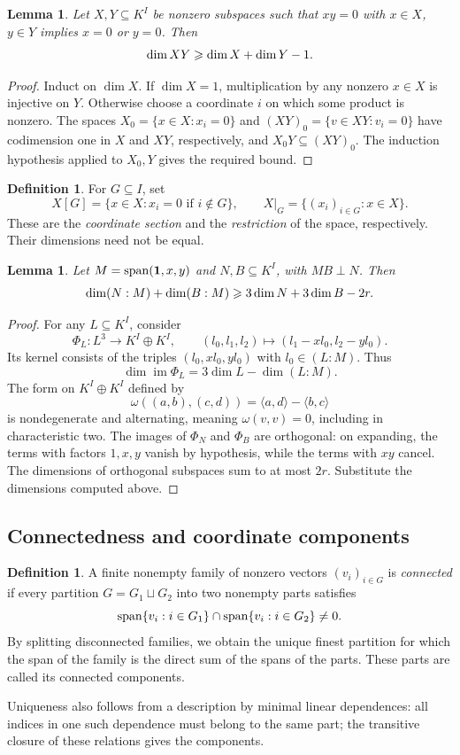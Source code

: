 \documentclass[11pt,a4paper]{article}
\numberwithin{equation}{section}
\theoremstyle{plain}
\newtheorem{lemma}[theorem]{Lemma}
\theoremstyle{definition}
\newtheorem{definition}[theorem]{Definition}
\DeclareMathOperator{\im}{im}\DeclareMathOperator{\supp}{supp}
\newcommand{\pair}[2]{\langle #1,#2\rangle}
\begin{document}
\begin{lemma}\label{lem:nz-growth}
Let $X,Y\subseteq K^I$ be nonzero subspaces such that $xy=0$ with
$x\in X$, $y\in Y$ implies $x=0$ or $y=0$. Then
\[
 \dim XY\geqslant\dim X+\dim Y-1.
\]
\end{lemma}
\begin{proof}
Induct on $\dim X$. If $\dim X=1$, multiplication by any nonzero
$x\in X$ is injective on $Y$. Otherwise choose a coordinate $i$
on which some product is nonzero. The spaces
$X_0=\{x\in X:x_i=0\}$ and $(XY)_0=\{v\in XY:v_i=0\}$
have codimension one in $X$ and $XY$, respectively, and
$X_0Y\subseteq(XY)_0$. The induction hypothesis applied to $X_0,Y$
gives the required bound.
\end{proof}

\begin{definition}
For $G\subseteq I$, set
\[
 X[G]=\{x\in X:x_i=0\text{ if }i\notin G\},\qquad
 X|_G=\{(x_i)_{i\in G}:x\in X\}.
\]
These are the \emph{coordinate section} and the \emph{restriction} of
the space, respectively. Their dimensions need not be equal.
\end{definition}

\begin{lemma}\label{lem:two-conductors}
Let $M=\operatorname{span}(\mathbf1,x,y)$ and $N,B\subseteq K^I$, with $MB\perp N$.
Then
\[
 \dim(N:M)+\dim(B:M)\geqslant3\dim N+3\dim B-2r.
\]
\end{lemma}
\begin{proof}
For any $L\subseteq K^I$, consider
\[
 \Phi_L:L^3\longrightarrow K^I\oplus K^I,\qquad
 (l_0,l_1,l_2)\longmapsto(l_1-xl_0,l_2-yl_0).
\]
Its kernel consists of the triples $(l_0,xl_0,yl_0)$ with $l_0\in(L:M)$.
Thus
\[
 \dim\im\Phi_L=3\dim L-\dim(L:M).
\]
The form on $K^I\oplus K^I$ defined by
\[
 \omega((a,b),(c,d))=\pair{a}{d}-\pair{b}{c}
\]
is nondegenerate and alternating, meaning $\omega(v,v)=0$, including
in characteristic two. The images of $\Phi_N$ and $\Phi_B$ are
orthogonal: on expanding, the terms with factors $1,x,y$ vanish by
hypothesis, while the terms with $xy$ cancel. The dimensions of
orthogonal subspaces sum to at most $2r$. Substitute the dimensions
computed above.
\end{proof}

\subsection{Connectedness and coordinate components}

\begin{definition}
A finite nonempty family of nonzero vectors $(v_i)_{i\in G}$ is
\emph{connected} if every partition $G=G_1\sqcup G_2$ into two nonempty
parts satisfies
\[
 \operatorname{span}\{v_i:i\in G_1\}\cap\operatorname{span}\{v_i:i\in G_2\}\ne0.
\]
By splitting disconnected families, we obtain the unique finest
partition for which the span of the family is the direct sum of the
spans of the parts. These parts are called its connected components.
\end{definition}
Uniqueness also follows from a description by minimal linear
dependences: all indices in one such dependence must belong to the
same part; the transitive closure of these relations gives the components.
\end{document}
